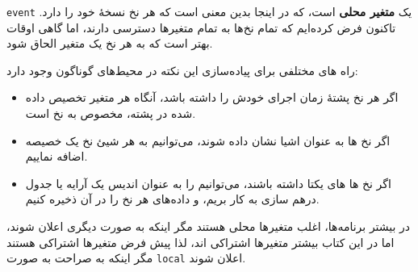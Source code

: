 \documentclass{book}
\newcommand{\clearemptydoublepage}{\newpage\cleardoublepage}
\begin{document}
    {\tt event}
    یک \textbf{متغیر محلی} است، که در اینجا بدین معنی است که هر نخ نسخهٔ خود را دارد.
    تاکنون فرض کرده‌ایم که تمام نخ‌ها به تمام متغیرها دسترسی دارند، اما گاهی اوقات بهتر است که به هر نخ یک متغیر الحاق شود.

    راه های مختلفی برای پیاده‌سازی این نکته در محیط‌های گوناگون وجود دارد:
    
\begin{itemize}

\item 
    اگر هر نخ پشتهٔ زمان اجرای خودش را داشته باشد، آنگاه هر متغیر تخصیص داده شده در پشته، 
    مخصوص به نخ است.

\item 
    اگر نخ ها به عنوان اشیا نشان داده شوند، می‌توانیم به هر شیئ نخ یک خصیصه اضافه نماییم.

\item 
    اگر نخ ها های یکتا داشته باشند، می‌توانیم  را به عنوان اندیس یک آرایه یا جدول درهم سازی به کار بریم، 
    و داده‌های هر نخ را در آن ذخیره کنیم.

\end{itemize}

    در بیشتر برنامه‌ها، اغلب متغیرها محلی هستند مگر اینکه به صورت دیگری اعلان شوند، 
    اما در این کتاب بیشتر متغیرها اشتراکی اند، لذا پیش فرض متغیرها اشتراکی هستند مگر اینکه به صراحت به صورت 
    {\tt local} اعلان شوند.


\clearemptydoublepage
\end{document}

